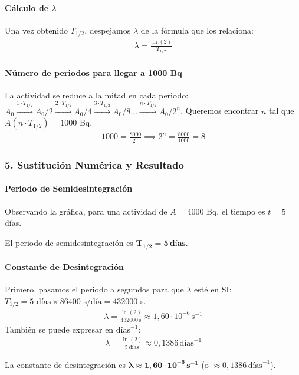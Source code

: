 \paragraph*{Cálculo de $\lambda$}
Una vez obtenido $T_{1/2}$, despejamos $\lambda$ de la fórmula que los relaciona:
\begin{gather}
    \lambda = \frac{\ln(2)}{T_{1/2}}
\end{gather}

\paragraph*{Número de periodos para llegar a 1000 Bq}
La actividad se reduce a la mitad en cada periodo:
$A_0 \xrightarrow{1 \cdot T_{1/2}} A_0/2 \xrightarrow{2 \cdot T_{1/2}} A_0/4 \xrightarrow{3 \cdot T_{1/2}} A_0/8 \dots \xrightarrow{n \cdot T_{1/2}} A_0/2^n$.
Queremos encontrar $n$ tal que $A(n \cdot T_{1/2}) = 1000$ Bq.
\begin{gather}
    1000 = \frac{8000}{2^n} \implies 2^n = \frac{8000}{1000} = 8
\end{gather}

\subsubsection*{5. Sustitución Numérica y Resultado}
\paragraph*{Periodo de Semidesintegración}
Observando la gráfica, para una actividad de $A = 4000$ Bq, el tiempo es $t=5$ días.
\begin{cajaresultado}
    El periodo de semidesintegración es $\boldsymbol{T_{1/2} = 5 \, días}$.
\end{cajaresultado}

\paragraph*{Constante de Desintegración}
Primero, pasamos el periodo a segundos para que $\lambda$ esté en SI: $T_{1/2} = 5 \text{ días} \times 86400 \text{ s/día} = 432000$ s.
\begin{gather}
    \lambda = \frac{\ln(2)}{432000 \, \text{s}} \approx 1,60 \cdot 10^{-6} \, \text{s}^{-1}
\end{gather}
También se puede expresar en días$^{-1}$:
\begin{gather}
    \lambda = \frac{\ln(2)}{5 \, \text{días}} \approx 0,1386 \, \text{días}^{-1}
\end{gather}
\begin{cajaresultado}
    La constante de desintegración es $\boldsymbol{\lambda \approx 1,60 \cdot 10^{-6} \, s^{-1}}$ (o $\approx 0,1386 \, \text{días}^{-1}$).
\end{cajaresultado}


